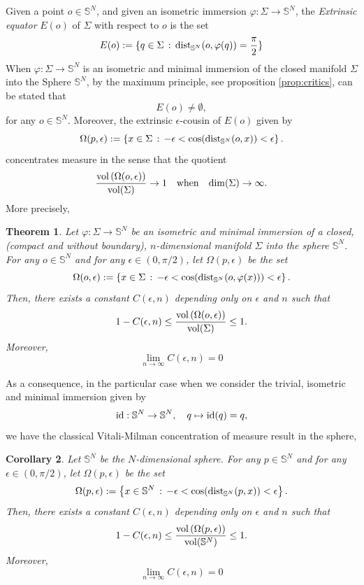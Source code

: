 \documentclass{amsart}
\newtheorem{theorem}{Theorem}[section]
\newtheorem{corollary}[theorem]{Corollary}
\theoremstyle{definition}
\theoremstyle{remark}
\begin{document}
Given a point $o\in \mathbb{S}^N$, and given an isometric immersion $\varphi:\Sigma\to \mathbb{S}^N$, the \emph{Extrinsic equator} $E(o)$ of $\Sigma$ with respect to $o$ is the set
$$
E(o):=\{ q\in \Sigma\, : \, {\rm dist}_{\mathbb{S}^N}(o,\varphi(q))=\frac{\pi}{2}\} 
$$
When $\varphi:\Sigma\to \mathbb{S}^N$ is an isometric and minimal immersion of the closed manifold $\Sigma$ into the Sphere $\mathbb{S}^N$, by the maximum principle, see proposition \ref{prop:critics}, can be stated that
$$
E(o)\neq \emptyset,
$$
for any $o\in\mathbb{S}^N$. Moreover, the extrinsic $\epsilon$-cousin of $E(o)$ given by
$$
\Omega(p,\epsilon):=\left\lbrace x\in \Sigma\, : \, -\epsilon<\cos({\rm dist}_{\mathbb{S}^N}(o,x))<\epsilon \right\rbrace.
$$
concentrates measure in the sense that the quotient 
$$
\frac{{\rm vol}\left(\Omega(o,\epsilon)\right)}{{\rm vol}(\Sigma)} \to 1\quad {\rm when}\quad {\rm dim}(\Sigma)\to\infty. 
$$
More precisely,
\begin{theorem}\label{teo:conc}
Let $\varphi: \Sigma\to \mathbb{S}^N$ be an isometric and minimal immersion of a closed, (compact and without boundary), $n$-dimensional manifold $\Sigma$ into the sphere  $\mathbb{S}^N$. For any $o\in\mathbb{S}^N$ and for any $\epsilon\in (0,\pi/2)$,  let $\Omega(p,\epsilon)$ be the set
$$
\Omega(o,\epsilon):=\left\lbrace x\in \Sigma\, : \, -\epsilon<\cos({\rm dist}_{\mathbb{S}^N}(o,\varphi(x)))<\epsilon \right\rbrace.
$$
Then,   there exists a constant $C(\epsilon,n)$ depending only on $\epsilon$ and $n$ such that
$$
1-C(\epsilon,n)\leq \frac{{\rm vol}\left(\Omega(o,\epsilon)\right)}{{\rm vol}(\Sigma)}\leq 1.
$$
Moreover,
$$
\lim_{n\to\infty}C(\epsilon,n)=0
$$
\end{theorem}

As a consequence, in the particular case when we consider the trivial, isometric and minimal immersion given by
$$
{\rm id}:\mathbb{S}^N\to \mathbb{S}^N,\quad q\mapsto {\rm id}(q)=q,
$$
we have the classical Vitali-Milman concentration of measure result in the sphere,
\begin{corollary}
Let $\mathbb{S}^N$ be the $N$-dimensional sphere. For any $p\in\mathbb{S}^N$ and for any $\epsilon\in (0,\pi/2)$,  let $\Omega(p,\epsilon)$ be the set
$$
\Omega(p,\epsilon):=\left\lbrace x\in \mathbb{S}^N\, : \, -\epsilon<\cos({\rm dist}_{\mathbb{S}^N}(p,x))<\epsilon \right\rbrace.
$$
Then,   there exists a constant $C(\epsilon,n)$ depending only on $\epsilon$ and $n$ such that
$$
1-C(\epsilon,n)\leq \frac{{\rm vol}\left(\Omega(p,\epsilon)\right)}{{\rm vol}(\mathbb{S}^N)}\leq 1.
$$
Moreover,
$$
\lim_{n\to\infty}C(\epsilon,n)=0
$$
\end{corollary}
\end{document}
